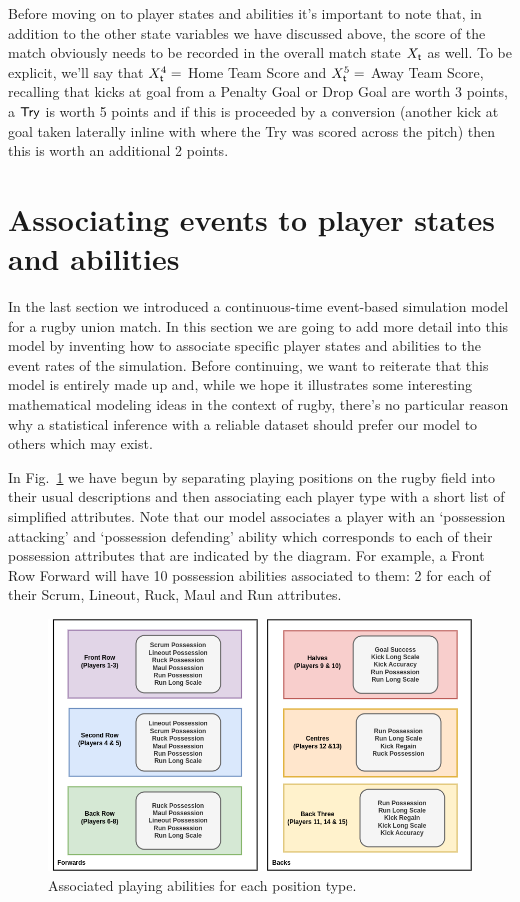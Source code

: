 Before moving on to player states and abilities it's important to note that, in addition to the other state variables we have discussed above, the score of the match obviously needs to be recorded in the overall match state $X_{\sf t}$ as well. To be explicit, we'll say that $X^4_{\sf t}=$ {\sf Home Team Score} and $X^5_{\sf t}=$ {\sf Away Team Score}, recalling that kicks at goal from a {\sf Penalty Goal} or {\sf Drop Goal} are worth 3 points, a ${\sf Try}$ is worth 5 points and if this is proceeded by a conversion (another kick at goal taken laterally inline with where the {\sf Try} was scored across the pitch) then this is worth an additional 2 points.

\section{\sffamily Associating events to player states and abilities}

In the last section we introduced a continuous-time event-based simulation model for a rugby union match. In this section we are going to add more detail into this model by inventing how to associate specific player states and abilities to the event rates of the simulation. Before continuing, we want to reiterate that this model is entirely made up and, while we hope it illustrates some interesting mathematical modeling ideas in the context of rugby, there's no particular reason why a statistical inference with a reliable dataset should prefer our model to others which may exist.

In Fig.~\ref{fig:player-abilities} we have begun by separating playing positions on the rugby field into their usual descriptions and then associating each player type with a short list of simplified attributes. Note that our model associates a player with an `possession attacking' and `possession defending' ability which corresponds to each of their possession attributes that are indicated by the diagram. For example, a Front Row Forward will have 10 possession abilities associated to them: 2 for each of their {\sf Scrum}, {\sf Lineout}, {\sf Ruck}, {\sf Maul} and {\sf Run} attributes.

\begin{figure}[h]
\includegraphics[width=15cm]{images/rugby-player-abilities.drawio.png}
\caption{Associated playing abilities for each position type.}
\label{fig:player-abilities}
\end{figure}

